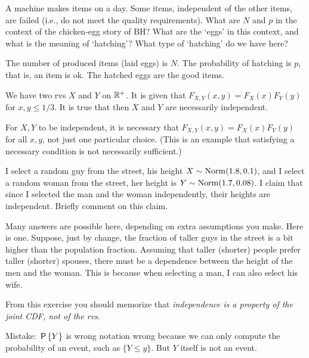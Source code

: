\begin{exercise}
A machine makes items on a day.
Some items, independent of the other items, are failed (i.e., do not meet the quality requirements).
What are $N$ and  $p$ in the context of the chicken-egg story of BH? What are the `eggs' in this context, and what is the meaning of `hatching'?
What type of `hatching' do we have here?
\begin{solution}
  The number of produced items (laid eggs) is $N$. The probability of hatching is $p$, that is, an item is ok. The hatched eggs are the good items.
\end{solution}
\end{exercise}



\begin{exercise}
We have two rvs $X$ and $Y$ on $\R^{+}$. It is given that $F_{X,Y}(x,y) = F_X(x)F_Y(y)$ for $x,y \leq 1/3$. It is true that then  $X$ and $Y$ are necessarily independent.
\begin{solution}
For $X, Y$ to be independent, it is necessary that  $F_{X,Y}(x,y) = F_X(x)F_Y(y)$ for all $x,y$, not just one particular choice. (This is an example that satisfying a necessary condition is not necessarily sufficient.)
\end{solution}
\end{exercise}

\begin{exercise}
I select a random guy from the street, his height $X\sim\Norm{1.8, 0.1}$, and I select a random woman from the street, her height is $Y\sim\Norm{1.7, 0.08}$.
I claim that since I selected the man and the woman independently, their heights are independent.
Briefly comment on this claim.


\begin{solution}
  Many answers are possible here, depending on extra assumptions you make.
  Here is one.
  Suppose, just by change, the fraction of taller guys in the street is a bit higher than the population fraction.
  Assuming that taller (shorter) people prefer taller (shorter) spouses, there must be a dependence between the height of the men and the woman. This is because when selecting a man, I can also select his wife.

From this exercise you should memorize that \emph{independence is a property of the joint CDF, not of the rvs}.

Mistake:   $\P{Y}$ is wrong notation wrong because we can only compute the probability of an event, such as $\{Y\leq y\}$. But $Y$ itself is not an event. \end{solution}
\end{exercise}


